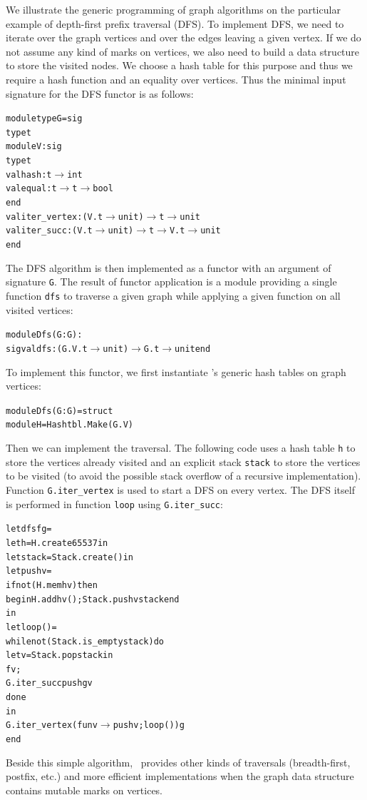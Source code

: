 We illustrate the generic programming of graph algorithms on the
particular example of depth-first prefix traversal (DFS).  To implement DFS,
we need to iterate over the graph vertices and over the edges leaving
a given vertex. If we do not assume any kind of marks on vertices, we
also need to build a data structure to store the visited nodes. 
We choose a hash table for this purpose and thus we require a hash
function and an equality over vertices.
Thus the minimal input signature for the DFS functor is as follows:
\begin{alltt}
module type G = sig
  type t
  module V : sig
    type t 
    val hash : t \ensuremath{\rightarrow} int 
    val equal : t \ensuremath{\rightarrow} t \ensuremath{\rightarrow} bool 
  end
  val iter_vertex : (V.t \ensuremath{\rightarrow} unit) \ensuremath{\rightarrow} t \ensuremath{\rightarrow} unit
  val iter_succ : (V.t \ensuremath{\rightarrow} unit) \ensuremath{\rightarrow} t \ensuremath{\rightarrow} V.t \ensuremath{\rightarrow} unit
end
\end{alltt}
The DFS algorithm is then implemented as a functor with an argument of
signature \texttt{G}. The result of functor application is a module
providing a single function \texttt{dfs} to traverse a given graph
while applying a given function on all visited vertices:
\begin{alltt}
module Dfs(G : G) : 
  sig val dfs : (G.V.t \ensuremath{\rightarrow} unit) \ensuremath{\rightarrow} G.t \ensuremath{\rightarrow} unit end
\end{alltt}
To implement this functor, we first instantiate \ocaml's generic hash
tables on graph vertices:
\begin{alltt}
module Dfs(G : G) = struct
  module H = Hashtbl.Make(G.V)
\end{alltt}
Then we can implement the traversal. The following code uses a hash
table \texttt{h} to store the vertices already visited and an explicit
stack \texttt{stack} to store the vertices to be visited (to avoid the
possible stack overflow of a recursive implementation). Function
\texttt{G.iter\_vertex} is used to start a DFS on every vertex. The
DFS itself is performed in function \texttt{loop} using \texttt{G.iter\_succ}:
\begin{alltt}
  let dfs f g = 
    let h = H.create 65537 in
    let stack = Stack.create () in
    let push v = 
      if not (H.mem h v) then 
      begin H.add h v (); Stack.push v stack end
    in
    let loop () =
      while not (Stack.is_empty stack) do
        let v = Stack.pop stack in
        f v;
        G.iter_succ push g v
      done
    in
    G.iter_vertex (fun v \ensuremath{\rightarrow} push v; loop ()) g
end
\end{alltt}
Beside this simple algorithm, \ocamlgraph\ provides other kinds of
traversals (breadth-first, postfix, etc.) and more efficient
implementations when the graph data structure contains mutable marks
on vertices.

